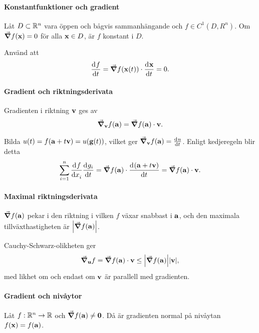 \proof

\paragraph{Konstantfunktioner och gradient}
Låt $D\subset\mathbb{R}^n$ vara öppen och bågvis sammanhängande och $f\in C^1(D, R^n)$. Om $\grad{f(\vect{x})} = 0$ för alla $\vect{x}\in D$, är $f$ konstant i $D$.

\proof
Använd att
\begin{align*}
	\deval{f}{t}{\vect{x}(t)} = \grad{f(\vect{x}(t))}\cdot\deval{\vect{x}}{t}{t} = 0.
\end{align*}

\paragraph{Gradient och riktningsderivata}
Gradienten i riktning $\vect{v}$ ges av
\begin{align*}
	\grad_{\vect{v}}f(\vect{a}) = \grad{f}(\vect{a})\cdot\vect{v}.
\end{align*}

\proof
Bilda $u(t) = f(\vect{a} + t\vect{v}) = u(\vect{g}(t))$, vilket ger $\grad_{\vect{v}}f(\vect{a}) = \deval{u}{t}{0}$. Enligt kedjeregeln blir detta
\begin{align*}
	\sum\limits_{i = 1}^{n}\deval{f}{x_i}{0}\deval{g_i}{t}{0} = \grad{f}(\vect{a})\cdot\deval{(\vect{a} + t\vect{v})}{t}{0} = \grad{f}(\vect{a})\cdot\vect{v}.
\end{align*}

\paragraph{Maximal riktningsderivata}
$\grad{f(\vect{a})}$ pekar i den riktning i vilken $f$ växar snabbast i $\vect{a}$, och den maximala tillväxthastigheten är $\abs{\grad{f(\vect{a})}}$.

\proof
Cauchy-Schwarz-olikheten ger
\begin{align*}
	\grad_{\vect{u}}f = \grad{f}(\vect{a})\cdot\vect{v}\leq\abs{\grad{f}(\vect{a})}\abs{\vect{v}},
\end{align*}
med likhet om och endast om $\vect{v}$ är parallell med gradienten.

\paragraph{Gradient och nivåytor}
Låt $f: \mathbb{R}^n\to\mathbb{R}$ och $\grad{f}(\vect{a})\neq\vect{0}$. Då är gradienten normal på nivåytan $f(\vect{x}) = f(\vect{a})$.

